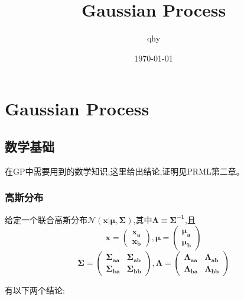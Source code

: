 \documentclass[UTF8,a4paper]{ctexart}
\author{qhy}
\date{\today}
\title{Gaussian Process}
\begin{document}
    \maketitle
    \tableofcontents
    \newpage
    \section{Gaussian Process}
        \subsection{数学基础}
        在GP中需要用到的数学知识,这里给出结论,证明见PRML第二章。
            \subsubsection{高斯分布}
            给定一个联合高斯分布$\mathcal{N}(\bm{x}|\bm{\mu,\Sigma})$,其中$\bm{\Lambda} \equiv \bm{ \Sigma^{-1}}$,且
            \begin{equation}
                \bm{x} = \left ( \begin{array}{l}
                \bm{x_a} \\
                \bm{x_b}
                \end{array}
                \right ),
                \bm{\mu} = \left ( \begin{array}{l}
                \bm{\mu_a} \\
                \bm{\mu_b}
                \end{array}
                \right )
            \end{equation}
            \begin{equation}
                \bm{\Sigma} = \left (
                \begin{array}{cc}
                \bm{\Sigma_{aa}} & \bm{\Sigma_{ab}}\\
                \bm{\Sigma_{ba}}& \bm{\Sigma_{bb}}
                \end{array} \right ),
                \bm{\Lambda} = \left (
                \begin{array}{cc}
                \bm{\Lambda_{aa}} & \bm{\Lambda_{ab}}\\
                \bm{\Lambda_{ba}}& \bm{\Lambda_{bb}}
                \end{array}\right )
            \end{equation}

            有以下两个结论:
\end{document}
